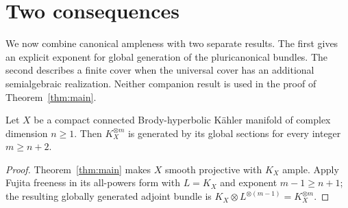 \section{Two consequences}\label{sec:consequences}

We now combine canonical ampleness with two separate results. The first
gives an explicit exponent for global generation of the pluricanonical
bundles. The second describes a finite cover when the universal cover
has an additional semialgebraic realization. Neither companion result
is used in the proof of Theorem~\ref{thm:main}.

\begin{corollary}\label{cor:pluricanonical-freeness}
Let $X$ be a compact connected Brody-hyperbolic K\"ahler manifold of
complex dimension $n\ge1$. Then $K_X^{\otimes m}$ is generated by its
global sections for every integer $m\ge n+2$.
\end{corollary}
\begin{proof}
Theorem~\ref{thm:main} makes $X$ smooth projective with $K_X$ ample.
Apply Fujita freeness in its all-powers form
\cite[Corollary~6.3]{OpenAIFujita2026} with $L=K_X$ and exponent
$m-1\ge n+1$; the resulting globally generated adjoint bundle is
$K_X\otimes L^{\otimes(m-1)}=K_X^{\otimes m}$.
\end{proof}

